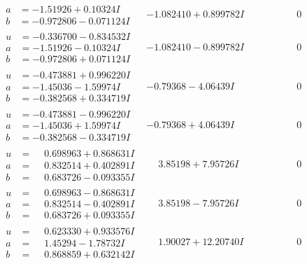 \documentclass[1p]{elsarticle_modified}
\theoremstyle{definition}
\begin{document}
$$\begin{array}{c|c|c}
\begin{aligned}
a &= -1.51926 + 0.10324 I \\
b &= -0.972806 - 0.071124 I\end{aligned}
 & -1.082410 + 0.899782 I & \phantom{-0.000000 } 0 \\ \hline\begin{aligned}
u &= -0.336700 - 0.834532 I \\
a &= -1.51926 - 0.10324 I \\
b &= -0.972806 + 0.071124 I\end{aligned}
 & -1.082410 - 0.899782 I & \phantom{-0.000000 } 0 \\ \hline\begin{aligned}
u &= -0.473881 + 0.996220 I \\
a &= -1.45036 - 1.59974 I \\
b &= -0.382568 + 0.334719 I\end{aligned}
 & -0.79368 - 4.06439 I & \phantom{-0.000000 } 0 \\ \hline\begin{aligned}
u &= -0.473881 - 0.996220 I \\
a &= -1.45036 + 1.59974 I \\
b &= -0.382568 - 0.334719 I\end{aligned}
 & -0.79368 + 4.06439 I & \phantom{-0.000000 } 0 \\ \hline\begin{aligned}
u &= \phantom{-}0.698963 + 0.868631 I \\
a &= \phantom{-}0.832514 + 0.402891 I \\
b &= \phantom{-}0.683726 - 0.093355 I\end{aligned}
 & \phantom{-}3.85198 + 7.95726 I & \phantom{-0.000000 } 0 \\ \hline\begin{aligned}
u &= \phantom{-}0.698963 - 0.868631 I \\
a &= \phantom{-}0.832514 - 0.402891 I \\
b &= \phantom{-}0.683726 + 0.093355 I\end{aligned}
 & \phantom{-}3.85198 - 7.95726 I & \phantom{-0.000000 } 0 \\ \hline\begin{aligned}
u &= \phantom{-}0.623330 + 0.933576 I \\
a &= \phantom{-}1.45294 - 1.78732 I \\
b &= \phantom{-}0.868859 + 0.632142 I\end{aligned}
 & \phantom{-}1.90027 + 12.20740 I & \phantom{-0.000000 } 0 \\ \hline\begin{aligned}

\end{aligned}
\end{array}$$
\end{document}
